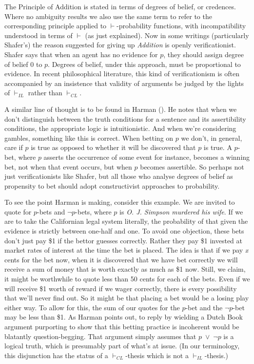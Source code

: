 \documentclass[
  11pt,
  letterpaper,
  DIV=11,
  numbers=noendperiod,
  oneside]{scrartcl}
\begin{document}
The Principle of Addition is stated in terms of degrees of belief, or
credences. Where no ambiguity results we also use the same term to refer
to the corresponding principle applied to \(\vdash\)-probability
functions, with incompatibility understood in terms of \(\vdash\) (as
just explained). Now in some writings (particularly Shafer's) the reason
suggested for giving up \emph{Addition} is openly verificationist.
Shafer says that when an agent has no evidence for \(p\), they should
assign degree of belief 0 to \(p\). Degrees of belief, under this
approach, must be proportional to evidence. In recent philosophical literature, this kind of
verificationism is often accompanied by an insistence that validity of
arguments be judged by the lights of \(\vdash_{IL}\) rather than
\(\vdash_{CL}\).

A similar line of thought is to be found in Harman
(). He notes that when we don't
distinguish between the truth conditions for a sentence and its
assertibility conditions, the appropriate logic is intuitionistic. And
when we're considering gambles, something like this is correct. When
betting on \(p\) we don't, in general, care if \(p\) is true as opposed
to whether it will be discovered that \(p\) is true. A \(p\)-bet, where
\(p\) asserts the occurrence of some event for instance, becomes a
winning bet, not when that event occurs, but when \(p\) becomes
assertible. So perhaps not just verificationists like Shafer, but all
those who analyse degrees of belief as propensity to bet should adopt
constructivist approaches to probability.

To see the point Harman is making, consider this example. We are invited
to quote for \(p\)-bets and \({\lnot}\)\(p\)-bets, where \(p\) is
\emph{O. J. Simpson murdered his wife}. If we are to take the
Californian legal system literally, the probability of that given the
evidence is strictly between one-half and one. To avoid one objection,
these bets don't just pay \$1 if the bettor guesses correctly. Rather
they pay \$1 invested at market rates of interest at the time the bet is
placed. The idea is that if we pay \emph{x} cents for the bet now, when
it is discovered that we have bet correctly we will receive a sum of
money that is worth exactly as much as \$1 now. Still, we claim, it
might be worthwhile to quote less than 50 cents for each of the bets.
Even if we will receive \$1 worth of reward if we wager correctly, there
is every possibility that we'll never find out. So it might be that
placing a bet would be a losing play either way. To allow for this, the
sum of our quotes for the \(p\)-bet and the \({\lnot}\)\(p\)-bet may be
less than \$1. As Harman points out, to reply by wielding a Dutch Book
argument purporting to show that this betting practice is incoherent
would be blatantly question-begging. That argument simply assumes that
\(p\)~\({\vee}\)~\({\lnot}\)\(p\) is a logical truth, which is
presumably part of what's at issue. (In our terminology, this
disjunction has the status of a \(\vdash_{CL}\)-thesis which is not a
\(\vdash_{IL}\)-thesis.)
\end{document}
